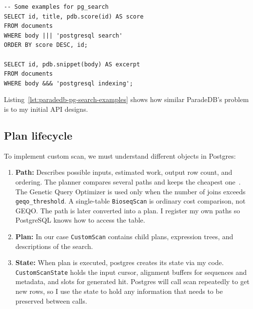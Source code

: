 \noindent\begin{minipage}{\linewidth}
\begin{lstlisting}[style=bioseq-search-sql,caption={ParadeDB pg\_search examples},label={lst:paradedb-pg-search-examples}]
-- Some examples for pg_search
SELECT id, title, pdb.score(id) AS score
FROM documents
WHERE body ||| 'postgresql search'
ORDER BY score DESC, id;

SELECT id, pdb.snippet(body) AS excerpt
FROM documents
WHERE body &&& 'postgresql indexing';
\end{lstlisting}
\end{minipage}

Listing~\ref{lst:paradedb-pg-search-examples} shows how similar ParadeDB's problem is to my initial API designs.\autocite{pigsty_pg_search}\autocite{neon_pg_search}

\subsection{Plan lifecycle}
\label{sec:planner-support-and-ownership}
\label{sec:custom-path-plan-lifecycle}

To implement custom scan, we must understand different objects in Postgres:
\begin{enumerate}
  \item \textbf{Path:} Describes
    possible inputs, estimated work, output row count, and ordering. The
    planner compares several paths and keeps the cheapest one~\autocite{postgresql_planner_optimizer}\autocite{conway_postgres_optimizer}.
    The Genetic Query Optimizer is used only when the number of joins exceeds \texttt{geqo\_threshold}.
    A single-table \texttt{BioseqScan} is ordinary cost comparison, not GEQO.
    The path is later converted into a plan. I register my own paths so PostgreSQL knows how to access the table.
  \item \textbf{Plan:} In our case \texttt{CustomScan} contains child plans, expression trees, and descriptions of the
    search.
  \item \textbf{State:} When plan is executed, postgres creates its state via my code. \texttt{CustomScanState} holds the input cursor, alignment
    buffers for sequences and metadata, and slots for generated hit.
    Postgres will call scan repeatedly to get new rows, so I use the state to hold any information that needs to be preserved between calls.
\end{enumerate}

